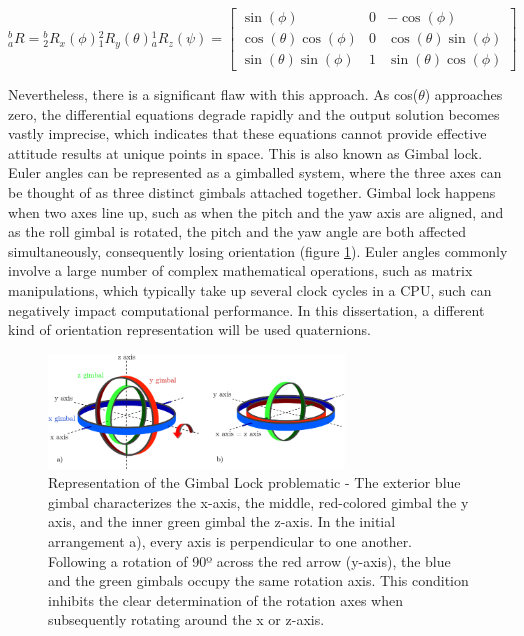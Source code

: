 \begin{equation}
    {^b_a}R = {^b_2}R_x(\phi){^2_1}R_y(\theta){^1_a}R_z(\psi)
    =
    \begin{bmatrix}
        \sin(\phi)             & 0 & -\cos(\phi)            \\
        \cos(\theta)\cos(\phi) & 0 & \cos(\theta)\sin(\phi) \\
        \sin(\theta)\sin(\phi) & 1 & \sin(\theta)\cos(\phi)
    \end{bmatrix}
    \label{eq:euler_equations}
\end{equation}

Nevertheless, there is a significant flaw with this approach. As cos($\theta$) approaches zero, the differential equations degrade rapidly and the output solution becomes vastly imprecise, which indicates that these equations cannot provide effective attitude results at unique points in space. This is also known as Gimbal lock. Euler angles can be represented as a gimballed system, where the three axes can be thought of as three distinct gimbals attached together. Gimbal lock happens when two axes line up, such as when the pitch and the yaw axis are aligned, and as the roll gimbal is rotated, the pitch and the yaw angle are both affected simultaneously, consequently losing orientation (figure \ref{fig:gimbal_lock}).
Euler angles commonly involve a large number of complex mathematical operations, such as matrix manipulations, which typically take up several clock cycles in a CPU, such can negatively impact computational performance. In this dissertation, a different kind of orientation representation will be used quaternions.

\begin{figure}[!h]
    \centering
    \includegraphics[width=0.7\textwidth]{figures/gimbal_lock.png}
    \caption{Representation of the Gimbal Lock problematic \cite{zeitlhofler2019nominal} - The exterior blue gimbal characterizes the x-axis, the middle, red-colored gimbal the y axis, and the inner green gimbal the z-axis. In the initial arrangement a), every axis is perpendicular to one another. Following a rotation of 90º across the red arrow (y-axis), the blue and the green gimbals occupy the same rotation axis. This condition inhibits the clear determination of the rotation axes when subsequently rotating around the x or z-axis. }
    \label{fig:gimbal_lock}
\end{figure}

